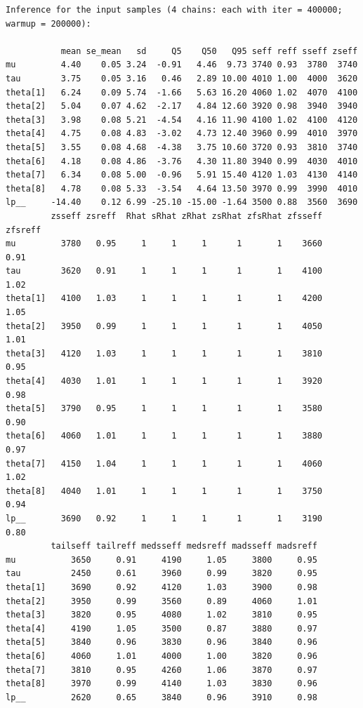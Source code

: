 \documentclass[american,]{article}
\begin{document}
\begin{verbatim}
Inference for the input samples (4 chains: each with iter = 400000; warmup = 200000):

           mean se_mean   sd     Q5    Q50   Q95 seff reff sseff zseff
mu         4.40    0.05 3.24  -0.91   4.46  9.73 3740 0.93  3780  3740
tau        3.75    0.05 3.16   0.46   2.89 10.00 4010 1.00  4000  3620
theta[1]   6.24    0.09 5.74  -1.66   5.63 16.20 4060 1.02  4070  4100
theta[2]   5.04    0.07 4.62  -2.17   4.84 12.60 3920 0.98  3940  3940
theta[3]   3.98    0.08 5.21  -4.54   4.16 11.90 4100 1.02  4100  4120
theta[4]   4.75    0.08 4.83  -3.02   4.73 12.40 3960 0.99  4010  3970
theta[5]   3.55    0.08 4.68  -4.38   3.75 10.60 3720 0.93  3810  3740
theta[6]   4.18    0.08 4.86  -3.76   4.30 11.80 3940 0.99  4030  4010
theta[7]   6.34    0.08 5.00  -0.96   5.91 15.40 4120 1.03  4130  4140
theta[8]   4.78    0.08 5.33  -3.54   4.64 13.50 3970 0.99  3990  4010
lp__     -14.40    0.12 6.99 -25.10 -15.00 -1.64 3500 0.88  3560  3690
         zsseff zsreff  Rhat sRhat zRhat zsRhat zfsRhat zfsseff zfsreff
mu         3780   0.95     1     1     1      1       1    3660    0.91
tau        3620   0.91     1     1     1      1       1    4100    1.02
theta[1]   4100   1.03     1     1     1      1       1    4200    1.05
theta[2]   3950   0.99     1     1     1      1       1    4050    1.01
theta[3]   4120   1.03     1     1     1      1       1    3810    0.95
theta[4]   4030   1.01     1     1     1      1       1    3920    0.98
theta[5]   3790   0.95     1     1     1      1       1    3580    0.90
theta[6]   4060   1.01     1     1     1      1       1    3880    0.97
theta[7]   4150   1.04     1     1     1      1       1    4060    1.02
theta[8]   4040   1.01     1     1     1      1       1    3750    0.94
lp__       3690   0.92     1     1     1      1       1    3190    0.80
         tailseff tailreff medsseff medsreff madsseff madsreff
mu           3650     0.91     4190     1.05     3800     0.95
tau          2450     0.61     3960     0.99     3820     0.95
theta[1]     3690     0.92     4120     1.03     3900     0.98
theta[2]     3950     0.99     3560     0.89     4060     1.01
theta[3]     3820     0.95     4080     1.02     3810     0.95
theta[4]     4190     1.05     3500     0.87     3880     0.97
theta[5]     3840     0.96     3830     0.96     3840     0.96
theta[6]     4060     1.01     4000     1.00     3820     0.96
theta[7]     3810     0.95     4260     1.06     3870     0.97
theta[8]     3970     0.99     4140     1.03     3830     0.96
lp__         2620     0.65     3840     0.96     3910     0.98
\end{verbatim}
\end{document}
